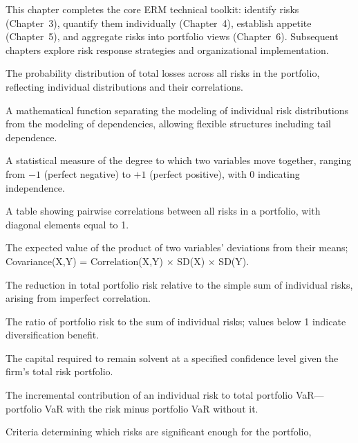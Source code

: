 \documentclass[11pt,openany]{book}
\begin{document}
This chapter completes the core ERM technical toolkit: identify risks
(Chapter~3), quantify them individually (Chapter~4), establish appetite
(Chapter~5), and aggregate risks into portfolio views (Chapter~6). Subsequent
chapters explore risk response strategies and organizational implementation.

\begin{keyterms}
  \item[\keyterm{Aggregate loss distribution}]
    The probability distribution of total losses across all risks in the
    portfolio, reflecting individual distributions and their correlations.
  \item[\keyterm{Copula}]
    A mathematical function separating the modeling of individual risk
    distributions from the modeling of dependencies, allowing flexible
    structures including tail dependence.
  \item[\keyterm{Correlation (\(\rho\))}]
    A statistical measure of the degree to which two variables move together,
    ranging from \(-1\) (perfect negative) to \(+1\) (perfect positive), with
    0 indicating independence.
  \item[\keyterm{Correlation matrix}]
    A table showing pairwise correlations between all risks in a portfolio,
    with diagonal elements equal to 1.
  \item[\keyterm{Covariance}]
    The expected value of the product of two variables' deviations from their
    means; Covariance(X,Y) = Correlation(X,Y) \(\times\) SD(X) \(\times\)
    SD(Y).
  \item[\keyterm{Diversification benefit}]
    The reduction in total portfolio risk relative to the simple sum of
    individual risks, arising from imperfect correlation.
  \item[\keyterm{Diversification ratio}]
    The ratio of portfolio risk to the sum of individual risks; values below 1
    indicate diversification benefit.
  \item[\keyterm{Economic capital}]
    The capital required to remain solvent at a specified confidence level
    given the firm's total risk portfolio.
  \item[\keyterm{Marginal VaR}]
    The incremental contribution of an individual risk to total portfolio
    VaR---portfolio VaR with the risk minus portfolio VaR without it.
  \item[\keyterm{Materiality threshold}]
    Criteria determining which risks are significant enough for the portfolio,

\end{keyterms}
\end{document}
